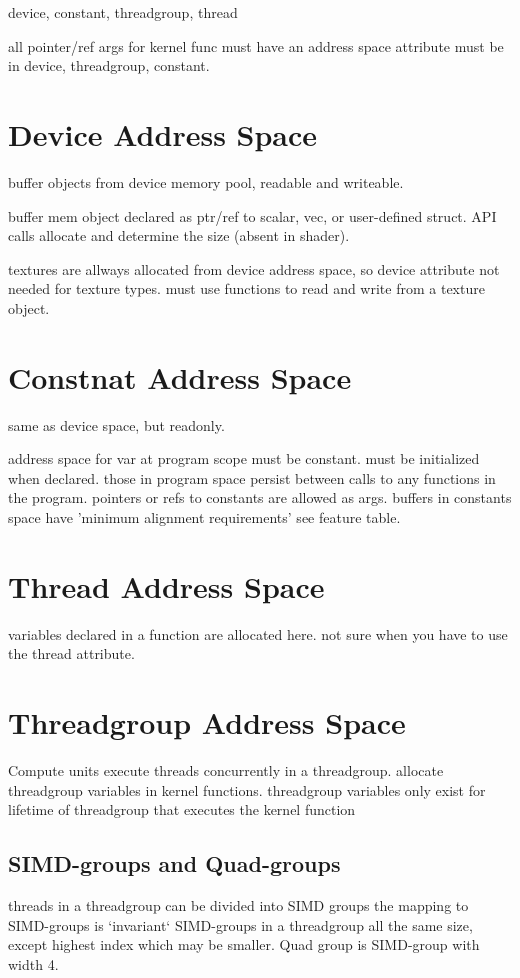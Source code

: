 
device, constant, threadgroup, thread

all pointer/ref args for kernel func must have an address space attribute
must be in device, threadgroup, constant.

\section{Device Address Space}

buffer objects from device memory pool, readable and writeable.

buffer mem object declared as ptr/ref to scalar, vec, or user-defined struct. API calls allocate and determine the size (absent in shader).

textures are allways allocated from device address space, so device attribute not needed for texture types.
must use functions to read and write from a texture object.

\section{Constnat Address Space}

same as device space, but readonly.

address space for var at program scope must be constant. must be initialized when declared.
those in program space persist between calls to any functions in the program.
pointers or refs to constants are allowed as args. 
buffers in constants space have 'minimum alignment requirements' see feature table.

\section{Thread Address Space}

variables declared in a function are allocated here.
not sure when you have to use the thread attribute. 

\section{Threadgroup Address Space}

Compute units execute threads concurrently in a threadgroup.
allocate threadgroup variables in kernel functions.
threadgroup variables only exist for lifetime of threadgroup that executes the kernel function

\subsection{SIMD-groups and Quad-groups}

threads in a threadgroup can be divided into SIMD groups
the mapping to SIMD-groups is `invariant`
SIMD-groups in a threadgroup all the same size, except highest index which may be smaller.
Quad group is SIMD-group with width 4.
